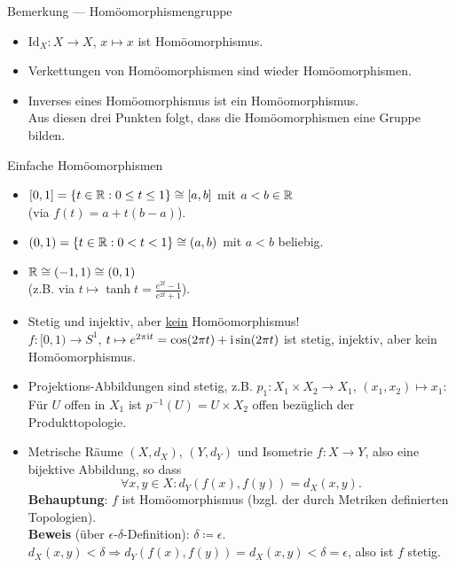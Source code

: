 \begin{remark}{Bemerkung --- Homöomorphismengruppe}
  \begin{itemize}
    \item $ \text{Id}_X: X \to X $, $ x \mapsto x $ ist Homöomorphismus.
    \item Verkettungen von Homöomorphismen sind wieder Homöomorphismen.
    \item Inverses eines Homöomorphismus ist ein Homöomorphismus. \\
      Aus diesen drei Punkten folgt, dass die Homöomorphismen eine Gruppe bilden.
  \end{itemize}
\end{remark}

\begin{example}{Einfache Homöomorphismen}
  \begin{itemize}
    \item $ [0,1] = \{ t \in \mathbb{R} : 0 \leq t \leq 1 \} \cong [a,b] $ mit $ a < b \in \mathbb{R} $ \\ (via $ f(t) = a+t(b-a) $).
    \item $ (0,1) = \{ t \in \mathbb{R} : 0 < t < 1 \} \cong (a,b) $ mit $ a < b $ beliebig. 
    \item $ \mathbb{R} \cong (-1, 1) \cong (0,1) $ \\ (z.B. via $ t \mapsto \tanh t = \tfrac{e^{2t}-1}{e^{2t}+1} $).
    \item Stetig und injektiv, aber \underline{kein} Homöomorphismus! \\
      $ f: [0,1) \to S^1 $, $ t \mapsto e^{2\pi\text{\rmfamily i} t} = \cos(2\pi t) + \text{\rmfamily i}\sin(2\pi t) $ ist stetig, injektiv, aber kein Homöomorphismus.
    \item Projektions-Abbildungen sind stetig, z.B. $ p_1: X_1 \times X_2 \to X_1 $, $ (x_1,x_2) \mapsto x_1 $: Für $ U $ offen in $ X_1 $ ist $ p^{-1}(U) = U \times X_2 $ offen bezüglich der Produkttopologie.
    \item Metrische Räume $ (X, d_X) $, $ (Y, d_Y) $ und Isometrie $ f: X \to Y $, also eine bijektive Abbildung, so dass
      \begin{equation*}
        \forall x, y \in X : d_Y(f(x), f(y)) = d_X(x, y)\text{.}
      \end{equation*}
      \textbf{Behauptung}: $ f $ ist Homöomorphismus (bzgl. der durch Metriken definierten Topologien). \\
      \textbf{Beweis} (über $ \epsilon $-$ \delta $-Definition): $ \delta \coloneqq \epsilon $. \\
        $ d_X(x, y) < \delta \Rightarrow d_Y(f(x), f(y)) = d_X(x,y) < \delta = \epsilon $, also ist $ f $ stetig. \\

\end{itemize}
\end{example}
